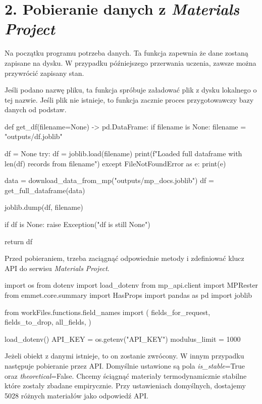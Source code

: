 {}
\fontsize{14}{16}\selectfont
\setlength{\parindent}{0pt}
\section*{2. Pobieranie danych z \textit{Materials Project}} 
\fontsize{12}{14}\selectfont

\hspace{1.5cm} Na początku programu potrzeba danych. 
Ta funkcja zapewnia że dane zostaną zapisane na dysku. 
W przypadku późniejszego przerwania uczenia, zawsze można przywrócić zapisany stan.

Jeśli podano nazwę pliku, ta funkcja spróbuje załadować plik z dysku lokalnego o tej nazwie. 
Jeśli plik nie istnieje, to funkcja zacznie proces przygotowawczy bazy danych od podstaw.

\begin{pythoncode}
def get_df(filename=None) -> pd.DataFrame:
    if filename is None:
        filename = "outputs/df.joblib"

    df = None
    try:
        df = joblib.load(filename)
        print(f"Loaded full dataframe with {len(df)} records from {filename}")
    except FileNotFoundError as e:
        print(e)

        data = download_data_from_mp("outputs/mp_docs.joblib")
        df = get_full_dataframe(data)

        joblib.dump(df, filename)

    if df is None:
        raise Exception("df is still None")

    return df
\end{pythoncode}


Przed pobieraniem, trzeba zaciągnąć odpowiednie metody i zdefiniować klucz API do serwisu \textit{Materials Project}. 

\begin{pythoncode}
import os
from dotenv import load_dotenv
from mp_api.client import MPRester
from emmet.core.summary import HasProps
import pandas as pd
import joblib

from workFiles.functions.field_names import (
    fields_for_request,
    fields_to_drop,
    all_fields,
)

load_dotenv()
API_KEY = os.getenv("API_KEY")
modulus_limit = 1000
\end{pythoncode}

\hspace{1.5cm} Jeżeli obiekt z danymi istnieje, to on zostanie zwrócony. W innym przypadku następuje pobieranie przez API. 
Domyślnie ustawione są pola \textit{is\_stable}=True oraz \textit{theoretical}=False. Chcemy ściągnąć materiały termodynamicznie stabilne które zostały zbadane empirycznie. Przy ustawieniach domyślnych, dostajemy 5028 różnych materiałów jako odpowiedź API.

